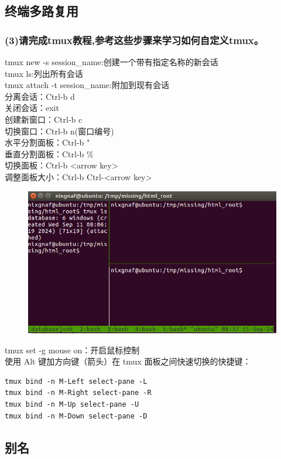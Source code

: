 \documentclass{article}
\begin{document}
\subsection{终端多路复用}

\subsubsection{(3)请完成tmux教程,参考这些步骤来学习如何自定义tmux。}
\noindent tmux new -s session\_name:创建一个带有指定名称的新会话\\
tmux ls:列出所有会话\\
tmux attach -t session\_name:附加到现有会话\\
分离会话：Ctrl-b d\\
关闭会话：exit\\
创建新窗口：Ctrl-b c\\
切换窗口：Ctrl-b n(窗口编号)\\
水平分割面板：Ctrl-b "\\
垂直分割面板：Ctrl-b \%\\
切换面板：Ctrl-b <arrow key>\\
调整面板大小：Ctrl-b Ctrl-<arrow key>\\

\begin{figure}[h]
    \centering
    \includegraphics[width=0.75\linewidth]{image3.png}
\end{figure}

\noindent tmux set -g mouse on：开启鼠标控制\\
使用 Alt 键加方向键（箭头）在 tmux 面板之间快速切换的快捷键：
\begin{lstlisting}[style=myStyle]
tmux bind -n M-Left select-pane -L
tmux bind -n M-Right select-pane -R
tmux bind -n M-Up select-pane -U
tmux bind -n M-Down select-pane -D
\end{lstlisting}

\subsection{别名}
\end{document}
